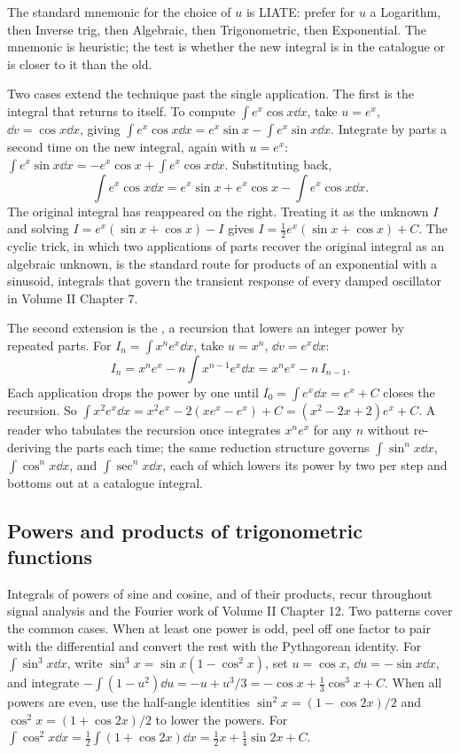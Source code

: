 

The standard mnemonic for the choice of $u$ is LIATE: prefer for
$u$ a Logarithm, then Inverse trig, then Algebraic, then
Trigonometric, then Exponential. The mnemonic is heuristic; the
test is whether the new integral is in the catalogue or is closer
to it than the old.

Two cases extend the technique past the single application. The
first is the integral that returns to itself. To compute $\int
e^{x}\cos x \dd x$, take $u = e^{x}$, $\dd v = \cos x\dd x$, giving
$\int e^{x}\cos x\dd x = e^{x}\sin x - \int e^{x}\sin x\dd x$.
Integrate by parts a second time on the new integral, again with
$u = e^{x}$: $\int e^{x}\sin x\dd x = -e^{x}\cos x + \int e^{x}\cos
x\dd x$. Substituting back,
\[
\int e^{x}\cos x\dd x = e^{x}\sin x + e^{x}\cos x - \int e^{x}\cos
x\dd x.
\]
The original integral has reappeared on the right. Treating it as
the unknown $I$ and solving $I = e^{x}(\sin x + \cos x) - I$ gives
$I = \tfrac{1}{2}e^{x}(\sin x + \cos x) + C$. The cyclic trick, in
which two applications of parts recover the original integral as an
algebraic unknown, is the standard route for products of an
exponential with a sinusoid, integrals that govern the transient
response of every damped oscillator in Volume II Chapter 7.

The second extension is the , a recursion
that lowers an integer power by repeated parts. For $I_{n} = \int
x^{n}e^{x}\dd x$, take $u = x^{n}$, $\dd v = e^{x}\dd x$:
\[
I_{n} = x^{n}e^{x} - n\int x^{n-1}e^{x}\dd x = x^{n}e^{x} -
n\,I_{n-1}.
\]
Each application drops the power by one until $I_{0} = \int e^{x}
\dd x = e^{x} + C$ closes the recursion. So $\int x^{2}e^{x}\dd x =
x^{2}e^{x} - 2(x e^{x} - e^{x}) + C = (x^{2} - 2x + 2)e^{x} + C$.
A reader who tabulates the recursion once integrates $x^{n}e^{x}$
for any $n$ without re-deriving the parts each time; the same
reduction structure governs $\int\sin^{n}x\dd x$, $\int\cos^{n}x
\dd x$, and $\int\sec^{n}x\dd x$, each of which lowers its power by
two per step and bottoms out at a catalogue integral.

\subsection{Powers and products of trigonometric functions}

Integrals of powers of sine and cosine, and of their products,
recur throughout signal analysis and the Fourier work of Volume II
Chapter 12. Two patterns cover the common cases. When at least one
power is odd, peel off one factor to pair with the differential and
convert the rest with the Pythagorean identity. For $\int\sin^{3}x
\dd x$, write $\sin^{3}x = \sin x(1 - \cos^{2}x)$, set $u = \cos x$,
$\dd u = -\sin x\dd x$, and integrate $-\int(1 - u^{2})\dd u =
-u + u^{3}/3 = -\cos x + \tfrac{1}{3}\cos^{3}x + C$. When all powers
are even, use the half-angle identities $\sin^{2}x = (1 - \cos
2x)/2$ and $\cos^{2}x = (1 + \cos 2x)/2$ to lower the powers. For
$\int\cos^{2}x\dd x = \tfrac{1}{2}\int(1 + \cos 2x)\dd x =
\tfrac{1}{2}x + \tfrac{1}{4}\sin 2x + C$.

